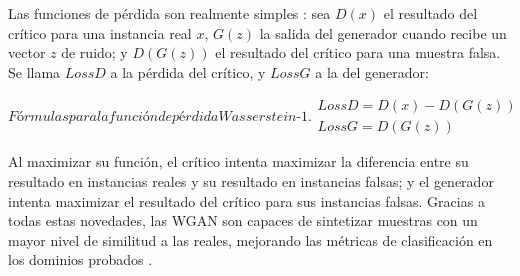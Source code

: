 Las funciones de pérdida son realmente simples \cite{GoogleGAN}: sea $D(x)$ el resultado del crítico para una instancia real $x$, $G(z)$ la salida del generador cuando recibe un vector $z$ de ruido; y $D(G(z))$ el resultado del crítico para una muestra falsa. Se llama $LossD$ a la pérdida del crítico, y $LossG$ a la del generador:

\begin{equation}[EQ:WASSERSTEINLOSS]{Fórmulas para la función de pérdida \textit{Wasserstein-1}.}
    \begin{aligned}  
	LossD = D(x) - D(G(z)) \\
    LossG = D(G(z))
    \end{aligned}
\end{equation}

Al maximizar su función, el crítico intenta maximizar la diferencia entre su resultado en instancias reales y su resultado en instancias falsas; y el generador intenta maximizar el resultado del crítico para sus instancias falsas. Gracias a todas estas novedades, las WGAN son capaces de sintetizar muestras con un mayor nivel de similitud a las reales, mejorando las métricas de clasificación en los dominios probados \cite{arjovsky2017wasserstein}.
